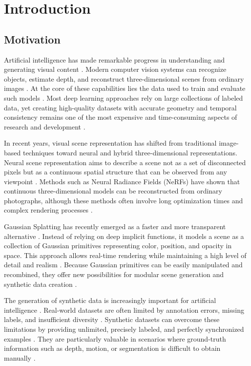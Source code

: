 \section{Introduction}

\subsection{Motivation}
Artificial intelligence has made remarkable progress in understanding and generating visual content \cite{lecun2015deep, krizhevsky2012imagenet}. Modern computer vision systems can recognize objects, estimate depth, and reconstruct three-dimensional scenes from ordinary images \cite{he2017mask, zollhoefer2018state}. At the core of these capabilities lies the data used to train and evaluate such models \cite{sun2017revisiting}. Most deep learning approaches rely on large collections of labeled data, yet creating high-quality datasets with accurate geometry and temporal consistency remains one of the most expensive and time-consuming aspects of research and development \cite{everingham2010pascal, lin2014microsoft}.

In recent years, visual scene representation has shifted from traditional image-based techniques toward neural and hybrid three-dimensional representations. Neural scene representation aims to describe a scene not as a set of disconnected pixels but as a continuous spatial structure that can be observed from any viewpoint \cite{mildenhall2021nerf}. Methods such as Neural Radiance Fields (NeRFs) have shown that continuous three-dimensional models can be reconstructed from ordinary photographs, although these methods often involve long optimization times and complex rendering processes \cite{barron2021mip}.

Gaussian Splatting has recently emerged as a faster and more transparent alternative \cite{kerbl3Dgaussians}. Instead of relying on deep implicit functions, it models a scene as a collection of Gaussian primitives representing color, position, and opacity in space. This approach allows real-time rendering while maintaining a high level of detail and realism \cite{fridovich2023k}. Because Gaussian primitives can be easily manipulated and recombined, they offer new possibilities for modular scene generation and synthetic data creation \cite{CutAndSplat2024}.

The generation of synthetic data is increasingly important for artificial intelligence \cite{tobin2017domain, denninger2019blenderproc}. Real-world datasets are often limited by annotation errors, missing labels, and insufficient diversity \cite{dwibedi2017cutpaste}. Synthetic datasets can overcome these limitations by providing unlimited, precisely labeled, and perfectly synchronized examples \cite{zanjani2025gaussian}. They are particularly valuable in scenarios where ground-truth information such as depth, motion, or segmentation is difficult to obtain manually \cite{godard2017unsupervised, bertasius2019maskprop}.

